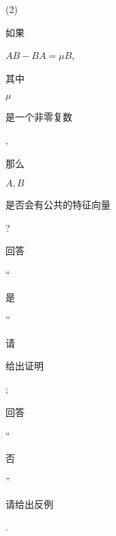 \documentclass[10pt]{article}
\begin{document}
(2) \begin{CJK}{UTF8}{mj}如果\end{CJK} $A B-B A=\mu B$, \begin{CJK}{UTF8}{mj}其中\end{CJK} $\mu$ \begin{CJK}{UTF8}{mj}是一个非零复数\end{CJK}, \begin{CJK}{UTF8}{mj}那么\end{CJK} $A, B$ \begin{CJK}{UTF8}{mj}是否会有公共的特征向量\end{CJK}? \begin{CJK}{UTF8}{mj}回答\end{CJK} “\begin{CJK}{UTF8}{mj}是\end{CJK}”\begin{CJK}{UTF8}{mj}请\end{CJK} \begin{CJK}{UTF8}{mj}给出证明\end{CJK}; \begin{CJK}{UTF8}{mj}回答\end{CJK} “\begin{CJK}{UTF8}{mj}否\end{CJK}”\begin{CJK}{UTF8}{mj}请给出反例\end{CJK}.
\end{document}
